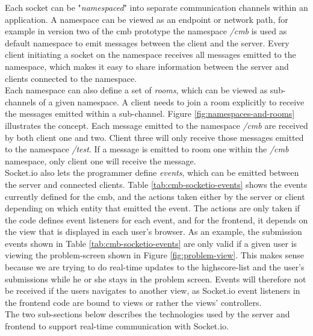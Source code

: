 Each socket can be "\textit{namespaced}" into separate communication channels within an application. A namespace can be viewed as an endpoint or network path, for example in version two of the \gls{cmb} prototype the namespace \textit{/cmb} is used as default namespace to emit messages between the client and the server. Every client initiating a socket on the namespace receives all messages emitted to the namespace, which makes it easy to share information between the server and clients connected to the namespace. \\

Each namespace can also define a set of \textit{rooms}, which can be viewed as sub-channels of a given namespace. A client needs to join a room explicitly to receive the messages emitted within a sub-channel. Figure \ref{fig:namespaces-and-rooms} illustrates the concept. Each message emitted to the namespace \textit{/cmb} are received by both client one and two. Client three will only receive those messages emitted to the namespace \textit{/test}. If a message is emitted to room one within the \textit{/cmb} namespace, only client one will receive the message. \\

Socket.io also lets the programmer define \textit{events}, which can be emitted between the server and connected clients. Table \ref{tab:cmb-socketio-events} shows the events currently defined for the \gls{cmb}, and the actions taken either by the server or client depending on which entity that emitted the event. The actions are only taken if the code defines event listeners for each event, and for the frontend, it depends on the view that is displayed in each user's browser. As an example, the submission events shown in Table \ref{tab:cmb-socketio-events} are only valid if a given user is viewing the problem-screen shown in Figure \ref{fig:problem-view}. This makes sense because we are trying to do real-time updates to the highscore-list and the user’s submissions while he or she stays in the problem screen. Events will therefore not be received if the users navigates to another view, as Socket.io event listeners in the frontend code are bound to views or rather the views’ controllers.  \\

The two sub-sections below describes the technologies used by the server and frontend  to support real-time communication with Socket.io.

